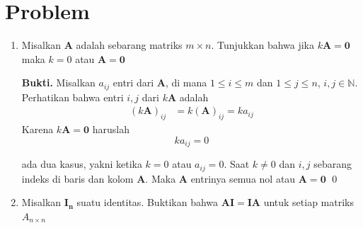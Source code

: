 \documentclass[a4paper, 12pt]{article}
\begin{document}
\section{Problem}
\begin{enumerate}
    \item Misalkan $\mathbf{A}$ adalah sebarang matriks $m\times n$. Tunjukkan bahwa jika $k\mathbf{A} = \mathbf{0}$ maka $k = 0$ atau $\mathbf{A} = \mathbf{0}$
    
\textbf{Bukti.} Misalkan $a_{ij}$ entri dari $\mathbf{A}$, di mana $1\le i\le m$ dan $1\le j \le n$, $i,j\in \mathbb{N}$. Perhatikan bahwa entri $i,j$ dari $k\mathbf{A}$ adalah
\begin{align*}
    (k\mathbf{A})_{ij} & = k (\mathbf{A})_{ij} =ka_{ij}
\end{align*}
    Karena $k\mathbf{A} = \mathbf{0}$ haruslah 
    \[ka_{ij} = 0\]

    ada dua kasus, yakni ketika $k = 0$ atau $a_{ij} = 0$. Saat $k\neq 0$ dan $i,j$ sebarang indeks di baris dan kolom $\mathbf{A}$. Maka $\mathbf{A}$ entrinya semua nol atau $\mathbf{A} = \mathbf{0}$ \qed

    \item Misalkan $\mathbf{I_n}$ suatu identitas. Buktikan bahwa $\mathbf{AI} = \mathbf{IA}$ untuk setiap matriks $A_{n\times n}$


\end{enumerate}
\end{document}
